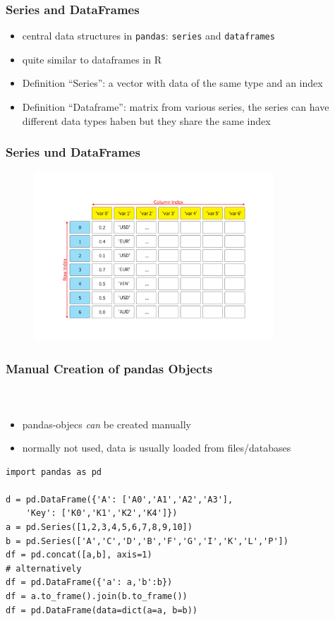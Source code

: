 \documentclass[ngerman]{beamer}
\begin{document}
\begin{frame}
\frametitle{Series and DataFrames}

\begin{itemize}
\item central data structures in  \texttt{pandas}: \texttt{series} and \texttt{dataframes}
\item quite similar to dataframes in R
\item Definition \enquote{Series}: a vector with data of the same type and an index
\item Definition \enquote{Dataframe}: matrix from various series, the series can have different data types haben but they share the same index
\end{itemize}
\end{frame}

\begin{frame}
\frametitle{Series und DataFrames}

\begin{figure}
\begin{center}
\includegraphics[trim=50mm 55mm 45mm 55mm,width=0.8\textwidth]{Pictures/SeriesFrames.pdf}
\end{center}
\end{figure}

\end{frame}


\begin{frame}[containsverbatim]
\frametitle{Manual Creation of pandas Objects}
\framesubtitle{~}

\begin{itemize}
	\item pandas-objecs \textit{can} be created manually
	\item normally not used, data is usually loaded from files/databases
\end{itemize}

\begin{lstlisting}
import pandas as pd

d = pd.DataFrame({'A': ['A0','A1','A2','A3'], 
	'Key': ['K0','K1','K2','K4']})
a = pd.Series([1,2,3,4,5,6,7,8,9,10])
b = pd.Series(['A','C','D','B','F','G','I','K','L','P'])
df = pd.concat([a,b], axis=1)
# alternatively
df = pd.DataFrame({'a': a,'b':b})
df = a.to_frame().join(b.to_frame())
df = pd.DataFrame(data=dict(a=a, b=b))
\end{lstlisting}
\end{frame}
\end{document}
